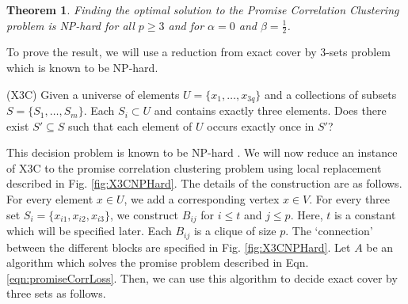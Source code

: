 \documentclass[12pt]{article}
\newtheorem{theorem}{Theorem}
\begin{document}
\begin{figure*}[!ht]
\caption{Part of graph $G$ constructed for the subset $S_i =  \{x_{i1}, x_{i2}, x_{i3}\}$. The graph is constructed by local replacement for $p = 4$. The vertices labeled $x_{ij}$ correspond to the elements in the universe $U$. If $S_i$ is included in the exact cover then the edges colored black and the edges colored blue represent the corresponding clustering of this part of the graph $G$. If $S_i$ is not included in the exact cover then the edges colored red and the edges colored black represent the clustering of this part of the graph.}
\label{fig:X3CNPHard}
\end{figure*}

\begin{theorem}
Finding the optimal solution to the Promise Correlation Clustering problem is NP-hard for all $p \ge 3$ and for $\alpha = 0$ and $\beta = \frac{1}{2}$.  
\end{theorem}

\noindent To prove the result, we will use a reduction from exact cover by $3$-sets problem which is known to be NP-hard.

(X3C) Given a universe of elements $U = \{x_1, \ldots, x_{3q}\}$ and a collections of subsets $S = \{S_1, \ldots, S_m\}$. Each $S_i \subset U$ and contains exactly three elements. Does there exist $S' \subseteq S$ such that each element of $U$ occurs exactly once in $S'$?

This decision problem is known to be NP-hard \cite{garey2002computers}. We will now reduce an instance of X3C to the promise correlation clustering problem using local replacement described in Fig. \ref{fig:X3CNPHard}. The details of the construction are as follows. For every element $x \in U$, we add a corresponding vertex $x \in V$. For every three set $S_i = \{x_{i1}, x_{i2}, x_{i3}\}$, we construct $B_{ij}$ for $i \le t$ and $j \le p$. Here, $t$ is a constant which will be specified later. Each $B_{ij}$ is a clique of size $p$. The `connection' between the different blocks are specified in Fig. \ref{fig:X3CNPHard}. Let $A$ be an algorithm which solves the promise problem described in Eqn. \ref{eqn:promiseCorrLoss}. Then, we can use this algorithm to decide exact cover by three sets as follows.
\end{document}
